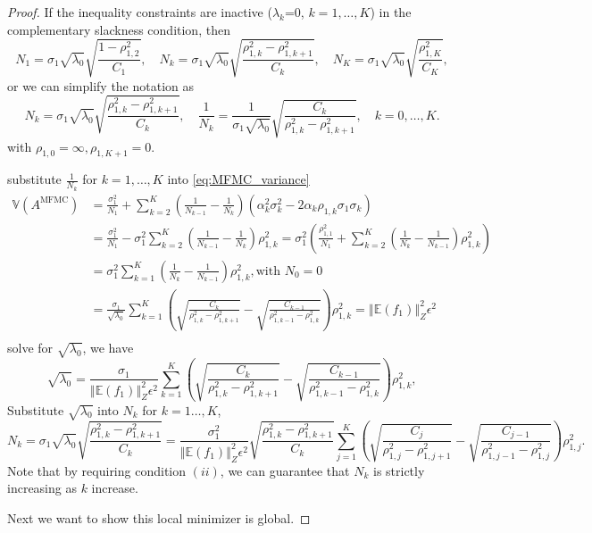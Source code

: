 \documentclass[final,3p,times,11pt]{elsarticle}
\begin{document}
\begin{proof}
If the inequality constraints are inactive ($\lambda_k$=0, $k=1,\dots, K$) in the complementary slackness condition, then 
\[
N_1 = \sigma_1\sqrt{\lambda_0}\sqrt{\frac{1-\rho_{1,2}^2}{C_1}}, \quad N_k = \sigma_1\sqrt{\lambda_0}\sqrt{\frac{\rho_{1,k}^2-\rho_{1,k+1}^2}{C_k}}, \quad N_K = \sigma_1\sqrt{\lambda_0}\sqrt{\frac{\rho_{1,K}^2}{C_K}},
\]
or we can simplify the notation as
\[
N_k = \sigma_1\sqrt{\lambda_0}\sqrt{\frac{\rho_{1,k}^2-\rho_{1,k+1}^2}{C_k}},\quad  \frac{1}{N_k} = \frac{1}{\sigma_1\sqrt{\lambda_0}}\sqrt{\frac{C_k}{\rho_{1,k}^2-\rho_{1,k+1}^2}}, \quad k=0,\ldots,K.
\]
with $\rho_{1,0}=\infty, \rho_{1,K+1}=0$.


substitute $\frac{1}{N_k}$ for $k=1,\ldots, K$ into \eqref{eq:MFMC_variance}
\begin{align*}
    \mathbb{V}\left(A^{\text{MFMC}}\right)&=\frac{\sigma_1^2}{N_1} + \sum_{k=2}^K \left(\frac{1}{N_{k-1}} - \frac{1}{N_k}\right)\left(\alpha_k^2\sigma_k^2 - 2\alpha_k\rho_{1,k}\sigma_1\sigma_k\right)\\
    &=\frac{\sigma_1^2}{N_1} - \sigma_1^2\sum_{k=2}^K \left(\frac{1}{N_{k-1}} - \frac{1}{N_k}\right)\rho_{1,k}^2 = \sigma_1^2\left(\frac{\rho_{1,1}^2}{N_1} +\sum_{k=2}^K \left( \frac{1}{N_k} - \frac{1}{N_{k-1}}\right)\rho_{1,k}^2\right)\\
    &= \sigma_1^2\sum_{k=1}^K \left( \frac{1}{N_k} - \frac{1}{N_{k-1}}\right)\rho_{1,k}^2, \text{with } N_0=0\\
    &=\frac{\sigma_1}{\sqrt{\lambda_0}}\sum_{k=1}^{K} \left(\sqrt{\frac{C_k}{\rho_{1,k}^2-\rho_{1,k+1}^2}} - \sqrt{\frac{C_{k-1}}{\rho_{1,k-1}^2-\rho_{1,k}^2}}\right)\rho_{1,k}^2 =\left\Vert\mathbb{E}(f_1) \right\Vert_{Z}^2\epsilon^2\\
\end{align*}
solve for $\sqrt{\lambda_0}$, we have 
\[
\sqrt{\lambda_0} = \frac{\sigma_1}{\left\Vert\mathbb{E}(f_1) \right\Vert_{Z}^2\epsilon^2}\sum_{k=1}^{K} \left(\sqrt{\frac{C_k}{\rho_{1,k}^2-\rho_{1,k+1}^2}} - \sqrt{\frac{C_{k-1}}{\rho_{1,k-1}^2-\rho_{1,k}^2}}\right)\rho_{1,k}^2,
\]
Substitute $\sqrt{\lambda_0}$ into $N_k$ for $k=1\ldots,K$,
\[
N_k = \sigma_1\sqrt{\lambda_0}\sqrt{\frac{\rho_{1,k}^2-\rho_{1,k+1}^2}{C_k}}= \frac{\sigma_1^2}{\left\Vert\mathbb{E}(f_1) \right\Vert_{Z}^2\epsilon^2}\sqrt{\frac{\rho_{1,k}^2-\rho_{1,k+1}^2}{C_k}}\sum_{j=1}^{K} \left(\sqrt{\frac{C_j}{\rho_{1,j}^2-\rho_{1,j+1}^2}} - \sqrt{\frac{C_{j-1}}{\rho_{1,j-1}^2-\rho_{1,j}^2}}\right)\rho_{1,j}^2.
\]
Note that by requiring condition $(ii)$, we can guarantee that $N_k$ is strictly increasing as $k$ increase. 

Next we want to show this local minimizer is global.



\end{proof}
\end{document}
